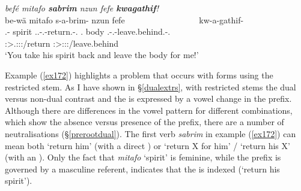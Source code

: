 \begin{exe}
	\ex \emph{befé mitafo \textbf{sabrim} nzun fefe \textbf{kwagathif}!}\\
	\glll be-wä mitafo s-a-brim-\Zero{} nzun fefe~~~~~~~~~~~~~~~~~ kw-a-gathif-\Zero{}\\
	\Ssg.\Erg-\Emph{} spirit \Tsg.\Masc.\Bet{}-\Vc.\Ndu-return.\Rs-\Ssg.\Imp{} \Fsg.\Dat{} body \Fsg.\Bet-\Vc.\Ndu-leave.behind.\Rs-\Ssg.\Imp{}\\
	{} {} \footnotesize{\Ssg:\Sbj>\Tsg.\Masc:\Io:\Imp:\Pfv/return} {} {} \footnotesize{\Ssg:\Sbj>\Fsg:\Io:\Imp:\Pfv/leave.behind}\\
	\trans `You take his spirit back and leave the body for me!' 
	\label{ex172}
\end{exe}

Example (\ref{ex172}) highlights a problem that occurs with  forms using the restricted stem. As I have shown in \S{}\ref{dualextrs}, with restricted stems the dual versus non-dual contrast and the  is expressed by a vowel change in the prefix. Although there are differences in the vowel pattern for different  combinations, which show the absence versus presence of the  prefix, there are a number of neutralisations (\S{}\ref{prerootdual}). The first verb \emph{sabrim} in example (\ref{ex172}) can mean both `return him' (with a direct ) or `return X for him' / `return his X' (with an ). Only the fact that \emph{mitafo} `spirit' is feminine, while the prefix is governed by a masculine referent, indicates that the  is indexed (`return his spirit').%

